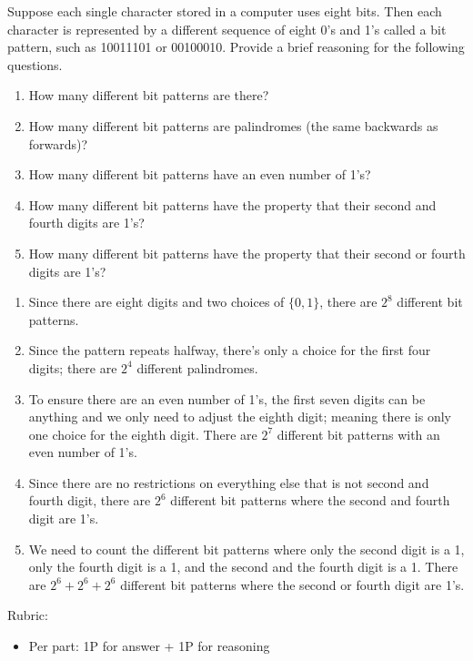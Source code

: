 \documentclass{article}
\theoremstyle{definition}
\begin{document}
\begin{question}
    Suppose each single character stored in a computer uses eight bits. 
    Then each character is represented by a different sequence of eight 0's and 1's called a bit pattern, 
    such as 10011101 or 00100010. Provide a brief reasoning for the following questions.
        \begin{enumerate}
            \item How many different bit patterns are there?
            \item How many different bit patterns are palindromes (the same backwards as forwards)?
            \item How many different bit patterns have an even number of 1's?
            \item How many different bit patterns have the property that their second and fourth digits are 1's?
            \item How many different bit patterns have the property that their second or fourth digits are 1's?
        \end{enumerate}
\end{question}
\begin{solution}
    \begin{enumerate}
        \item Since there are eight digits and two choices of $\{0, 1\}$, there are $2^8$ different bit patterns. 
        \item Since the pattern repeats halfway, there's only a choice for the first four digits; there are $2^4$ different palindromes.
        \item To ensure there are an even number of 1's, the first seven digits can be anything and we only need to adjust the eighth digit; meaning there is only one choice for the eighth digit. There are $2^7$ different bit patterns with an even number of 1's.
        \item Since there are no restrictions on everything else that is not second and fourth digit, there are $2^6$ different bit patterns where the second and fourth digit are 1's.
        \item We need to count the different bit patterns where only the second digit is a 1, only the fourth digit is a 1, and the second and the fourth digit is a 1. There are $2^6+2^6+2^6$ different bit patterns where the second or fourth digit are 1's.
    \end{enumerate}
    
{\color{red} Rubric:
\begin{itemize}
\item Per part: 1P for answer + 1P for reasoning
\end{itemize}}
\end{solution}
\end{document}
